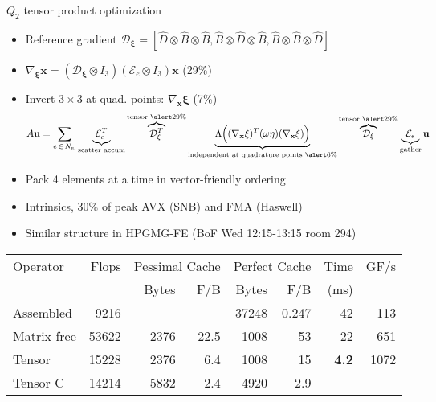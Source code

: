 \documentclass{beamer}
\begin{document}
\begin{frame}{$Q_2$ tensor product optimization}
  \begin{itemize}
  \item Reference gradient $\mathcal D_{\mathbf \xi} = [ \hat D \otimes \hat B \otimes \hat B, \hat B \otimes \hat D \otimes \hat B, \hat B \otimes \hat B \otimes \hat D]$
  \item $\nabla_{\mathbf\xi} \mathbf x = (\mathcal D_{\mathbf\xi}\otimes I_3) (\mathcal E_e\otimes I_3) \mathbf x$ \alert{(29\%)}
  \item Invert $3\times 3$ at quad. points: $\nabla_{\mathbf x} \mathbf \xi$ \alert{(7\%)}
    \begin{equation*}
      A \mathbf u = \sum_{e \, \in \, N_\text{el}} 
      \underbrace{\mathcal E_e^T}_{\text{scatter accum}}
      \overbrace{\mathcal D_{\mathbf \xi}^T}^{\text{tensor \alert{29\%}}}
      \underbrace{\Lambda\Big((\nabla_{\mathbf x}\mathbf\xi)^T (\omega \eta) (\nabla_{\mathbf x}\mathbf\xi) \Big)}_{\text{independent at quadrature points \alert{6\%}}}
      \overbrace{\mathcal D_{\mathbf \xi}}^{\text{tensor \alert{29\%}}}
      \underbrace{\mathcal E_e}_{\text{gather}} \mathbf u
    \end{equation*}
  \item Pack 4 elements at a time in vector-friendly ordering
  \item Intrinsics, $30\%$ of peak AVX (SNB) and FMA (Haswell)
  \item Similar structure in HPGMG-FE (BoF Wed 12:15-13:15 room 294)
  \end{itemize}
  \vspace{-1.5em}
  \begin{center}
    \begin{tabular}{lrrrrrrr}
      \toprule
      Operator & Flops & \multicolumn{2}{c}{Pessimal Cache} & \multicolumn{2}{c}{Perfect Cache} & Time & GF/s \\
               & & Bytes & F/B & Bytes & F/B & (ms) & \\
      \midrule
      Assembled & 9216 & --- & --- &  37248 & 0.247 & 42 & 113 \\
      Matrix-free & 53622 & 2376 & 22.5 & 1008 & 53 & 22 & 651 \\
      Tensor & 15228 & 2376 & 6.4 & 1008 & 15 & \textbf {4.2} & 1072 \\
      Tensor C & 14214 & 5832 & 2.4 & 4920 & 2.9 & --- & --- \\
      \bottomrule
    \end{tabular}
  \end{center}
\end{frame}
\end{document}
